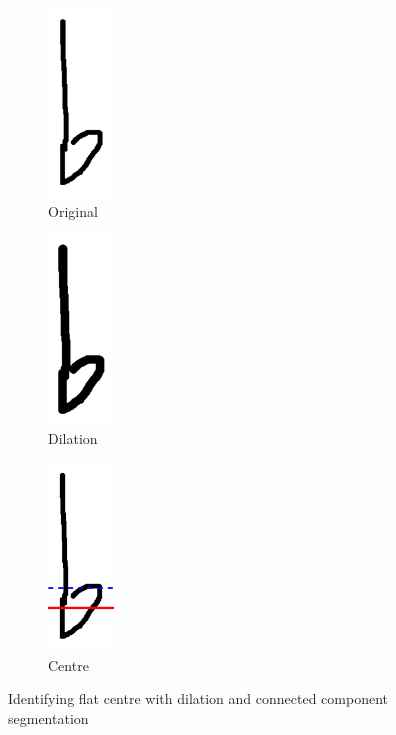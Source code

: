 \begin{figure}[H]
    \centering
    \begin{subfigure}[b]{.2\linewidth}
        \centering
        \includegraphics[height=5cm]{gfx/techniques/scoring/flats/6193-dilation-original.png}
        \caption{Original}
    \end{subfigure}
    \begin{subfigure}[b]{.2\linewidth}
        \centering
        \includegraphics[height=5cm]{gfx/techniques/scoring/flats/6193-dilation-dilated.png}
        \caption{Dilation}
        \label{fig:flat-dilation}
    \end{subfigure}
    \begin{subfigure}[b]{.2\linewidth}
        \centering
        \includegraphics[height=5cm]{gfx/techniques/scoring/flats/6193-dilation-center}
        \caption{Centre}
    \end{subfigure}

  \caption{Identifying flat centre with dilation and connected component segmentation}
  \label{fig:flats-centre-dilation}
\end{figure}

